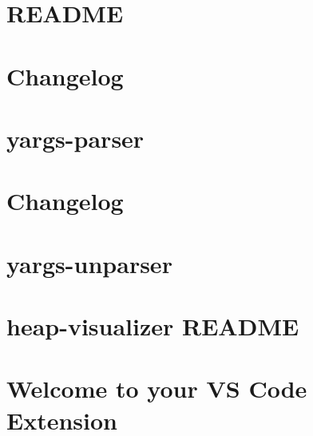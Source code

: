 \let\mypdfximage\pdfximage\def\pdfximage{\immediate\mypdfximage}\documentclass[twoside]{book}
\newcommand{\+}{\discretionary{\mbox{\scriptsize$\hookleftarrow$}}{}{}}
\begin{document}
\chapter{R\+E\+A\+D\+ME}
\label{md_heap-visualizer_node_modules_yargs__r_e_a_d_m_e}

\chapter{Changelog}
\label{md_heap-visualizer_node_modules_yargs-parser__c_h_a_n_g_e_l_o_g}

\chapter{yargs-\/parser}
\label{md_heap-visualizer_node_modules_yargs-parser__r_e_a_d_m_e}

\chapter{Changelog}
\label{md_heap-visualizer_node_modules_yargs-unparser__c_h_a_n_g_e_l_o_g}

\chapter{yargs-\/unparser}
\label{md_heap-visualizer_node_modules_yargs-unparser__r_e_a_d_m_e}

\chapter{heap-\/visualizer R\+E\+A\+D\+ME}
\label{md_heap-visualizer__r_e_a_d_m_e}

\chapter{Welcome to your VS Code Extension}
\label{md_heap-visualizer_vsc-extension-quickstart}

\end{document}

